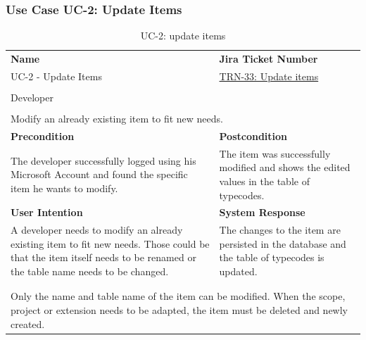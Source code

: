\subsubsection{Use Case UC-2: Update Items}\label{subsubsec:use-case-uc-2:-update-items}

\begin{table}[H]
    \centering
    \begin{tabular}{|p{}|p{}|}

        \hline
        \rowcolor{gray!50}\textbf{Name} & \textbf{Jira Ticket Number} \\
        UC-2 - Update Items &
        \href{https://fh-burgenland.atlassian.net/browse/TRN-33}{TRN-33: Update items} \\ \hline

        \rowcolor{gray!50}\multicolumn{2}{|l|}{\textbf{User Role}} \\
        \multicolumn{2}{|l|}{Developer} \\ \hline

        \rowcolor{gray!50}\multicolumn{2}{|l|}{\textbf{Purpose}} \\
        \multicolumn{2}{|l|}{Modify an already existing item to fit new needs.} \\ \hline

        \rowcolor{gray!50}\textbf{Precondition} & \textbf{Postcondition} \\
        The developer successfully logged using his Microsoft Account and found the specific item he wants to modify.
        &
        The item was successfully modified and shows the edited values in the table of typecodes. \\ \hline

        \rowcolor{gray!50}\textbf{User Intention} & \textbf{System Response} \\
        A developer needs to modify an already existing item to fit new needs.
        Those could be that the item itself needs to be renamed or the table name needs to be changed.
        &
        The changes to the item are persisted in the database and the table of typecodes is updated. \\ \hline

        \multicolumn{2}{|c|}{} \\ \hline

        \rowcolor{gray!50}\multicolumn{2}{|l|}{\textbf{Remarks}} \\
        \multicolumn{2}{|p{\textwidth}|}{Only the name and table name of the item can be modified. When the scope, project or extension needs to be adapted, the item must be deleted and newly created.} \\ \hline
    \end{tabular}
    \caption{UC-2: update items}
    \label{tab:uc-2_update_items}
\end{table}

